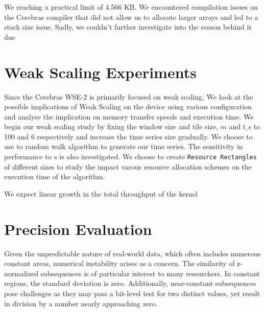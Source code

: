 We reaching a practical limit of 4.566 KB. We encountered compilation issues on the Cerebras compiler that did not allow us to allocate larger arrays and led to a stack size issue. Sadly, we couldn't further investigate into the reason behind it due



\section{Weak Scaling Experiments}

Since the Cerebras WSE-2 is primarily focused on weak scaling, We look at the possible implications of Weak Scaling on the device using various configuration and analyse the implication on memory transfer speeds and execution time. We begin our weak scaling study by fixing the window size and tile size, $m$ and $t\_s$ to 100 and 6 respectively and increase the time series size gradually. We choose to use to random walk algorithm to generate our time series.
The sensitivity in performance to $s$ is also investigated. We choose to create \texttt{Resource Rectangles} of different sizes to study the impact varous resource allocation schemes on the execution time of the algorithm.

We expect linear growth in the total throughput of the kernel

\section{Precision Evaluation}

Given the unpredictable nature of real-world data, which often includes numerous constant areas, numerical instability arises as a concern. The similarity of z-normalized subsequences is of particular interest to many researchers. In constant regions, the standard deviation is zero. Additionally, near-constant subsequences pose challenges as they may pass a bit-level test for two distinct values, yet result in division by a number nearly approaching zero.

